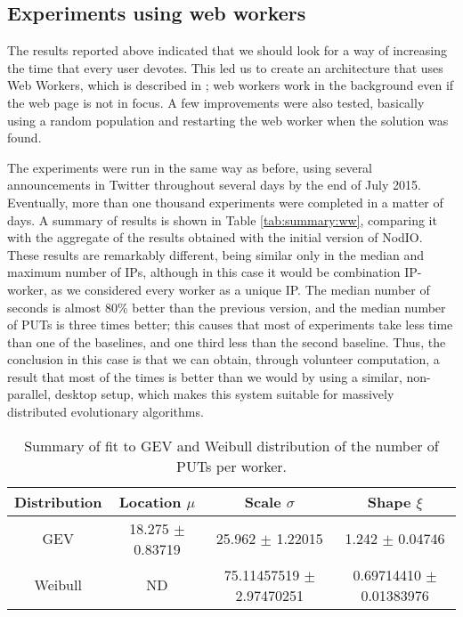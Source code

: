 \documentclass[journal,onecolumn]{IEEEtran}
\begin{document}
\subsection{Experiments using web workers}
\label{sec:w2}

The results reported above indicated that we should look for a way of
increasing the time that every user devotes. This led us to create an
architecture that uses Web Workers, which is described in
\cite{2016arXiv160101607M}; web workers work in the background even if
the web page is not in focus. A few improvements were also tested,
basically using a random population and restarting the web worker when
the solution was found.

The experiments were run in the same way as before, using several
 announcements in Twitter throughout several days by the end of July
2015. Eventually, more than one thousand experiments were completed in
a matter of days. A summary of results is shown in Table
\ref{tab:summary:ww}, comparing it with the aggregate of the results
obtained with the initial version of {\sf NodIO}. These results are
remarkably different, being similar only in the median and maximum
number of IPs, although in this case it would be combination
IP-worker, as we considered every worker as a unique IP. The median
number of seconds is almost 80\% better than the previous version, and
the median number of PUTs is three times better; this causes that most
of experiments take less time than one of the baselines, and one third
less than the second baseline. Thus, the conclusion in this case is
that we can obtain, through volunteer computation, a result that most 
of the times is better than we would by using a similar, non-parallel,
desktop setup, which makes this system suitable for massively
distributed evolutionary algorithms.
%
\begin{table*}
\caption{Summary of fit to GEV and Weibull distribution of
  the number of PUTs per worker. \label{tab:puts:ww}}
\begin{center}
\begin{tabular}{cccc}
\hline
Distribution & Location $\mu$ & Scale $\sigma$ & Shape $\xi$ \\
\hline
GEV & 18.275 $\pm$ 0.83719  &  25.962  $\pm$ 1.22015 & 1.242   $\pm$
0.04746 \\
Weibull & ND & 75.11457519 $\pm$ 2.97470251  & 0.69714410 $\pm$ 0.01383976 \\
\hline
\end{tabular}
\end{center}
\end{table*}
%
\end{document}
